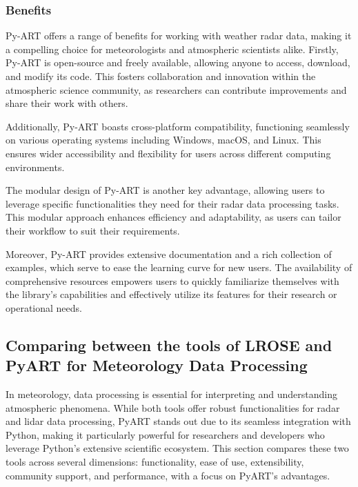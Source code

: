 \subsubsection{Benefits}
Py-ART offers a range of benefits for working with weather radar data, making it
a compelling choice for meteorologists and atmospheric scientists alike.
Firstly, Py-ART is open-source and freely available, allowing anyone to access,
download, and modify its code. This fosters collaboration and innovation within
the atmospheric science community, as researchers can contribute improvements
and share their work with others.

Additionally, Py-ART boasts cross-platform compatibility, functioning seamlessly
on various operating systems including Windows, macOS, and Linux. This ensures
wider accessibility and flexibility for users across different computing
environments.

The modular design of Py-ART is another key advantage, allowing users to
leverage specific functionalities they need for their radar data processing
tasks. This modular approach enhances efficiency and adaptability, as users can
tailor their workflow to suit their requirements.

Moreover, Py-ART provides extensive documentation and a rich collection of
examples, which serve to ease the learning curve for new users. The availability
of comprehensive resources empowers users to quickly familiarize themselves with
the library's capabilities and effectively utilize its features for their
research or operational needs.


\subsection{Comparing between the tools of LROSE and PyART for Meteorology Data Processing}
In meteorology, data processing is essential for interpreting and understanding
atmospheric phenomena. While both tools offer robust functionalities for radar
and lidar data processing, PyART stands out due to its seamless integration with
Python, making it particularly powerful for researchers and developers who
leverage Python's extensive scientific ecosystem. This section compares these
two tools across several dimensions: functionality, ease of use, extensibility,
community support, and performance, with a focus on PyART's advantages.

